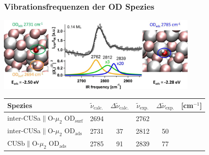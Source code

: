 \documentclass[hyperref={pdfpagelabels=false}]{beamer}
\begin{document}
\begin{frame}
\frametitle{Vibrationsfrequenzen der OD Spezies}
\begin{center}
  \includegraphics[width=0.75\textwidth]{figures/TOC_fig.jpg}
\end{center}
  \pause
  \vspace{-.3cm}
 \begin{table}[!h]
  \centering
  \begin{tabular}{l|cc|ccc}
 \toprule
 Spezies & $\tilde{\nu}_{\textrm{calc.}}$&$\Delta \tilde{\nu}_{\textrm{calc.}}$ &$\tilde{\nu}_{\textrm{exp.}}$   & $\Delta \tilde{\nu}_{\textrm{exp.}}$ &[cm$^{-1}$]\\\midrule
  inter-CUSa$\parallel$O-$\mu_2$ OD$_\textrm{surf}$& 2694& & 2762&& \\
  inter-CUSa$\parallel$O-$\mu_2$ OD$_\textrm{ads}$&2731 & 37 &2812 & 50&\\
  CUSb$\parallel$O-$\mu_2$ OD$_\textrm{ads}$& 2785& 91 &2839 & 77 &\\\bottomrule
  \end{tabular} 
\end{table}
{}
\end{frame} 
 
\end{document}
